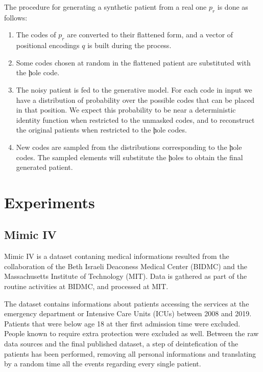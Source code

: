 \documentclass[]{marticle}
\begin{document}
The procedure for generating a synthetic patient from a real one $p_r$ is done as follows:
\begin{enumerate}
\item The codes of $p_r$ are converted to their flattened form, and a vector of positional encodings
$q$ is built during the process.

\item Some codes chosen at random in the flattened patient are substituted with the \c{hole} code.

\item The noisy patient is fed to the generative model. For each code in input we have a
distribution of probability over the possible codes that can be placed in that position. We expect
this probability to be near a deterministic identity function when restricted to the unmasked codes,
and to reconstruct the original patients when restricted to the \c{hole} codes. 

\item New codes are sampled from the distributions corresponding to the \c{hole} codes. The sampled
elements will substitute the \c{hole}s to obtain the final generated patient.
\end{enumerate}

\section{Experiments}

\subsection{Mimic IV}

Mimic IV \cite{mimic-iv-cit} is a dataset contaning medical informations resulted from the collaboration
of the Beth Israeli Deaconess Medical Center (BIDMC) and the Massachusetts Institute of Technology
(MIT). Data is gathered as part of the routine activities at BIDMC, and processed at MIT.

The dataset contains informations about patients accessing the services at the emergency department
or Intensive Care Units (ICUs) between 2008 and 2019. Patients that were below age 18 at ther first
admission time were excluded. People known to require extra protection were excluded as well.
Between the raw data sources and the final published dataset, a step of deintefication of the
patients has been performed, removing all personal informations and translating by a random time all
the events regarding every single patient.
\end{document}
